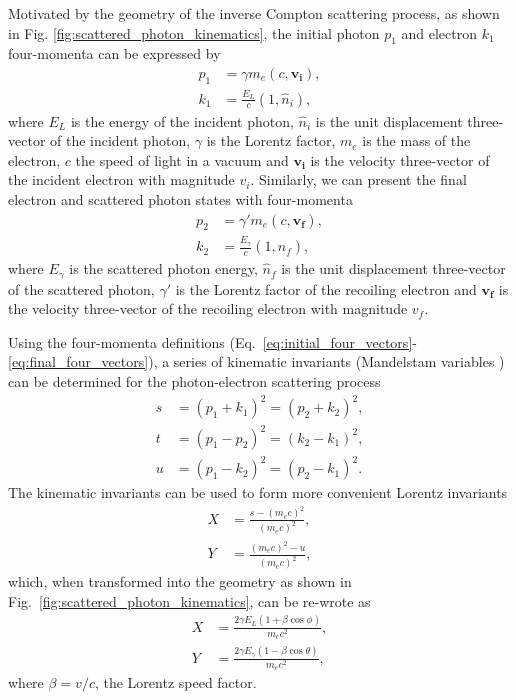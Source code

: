 \documentclass[../main.tex]{subfiles}
\begin{document}
Motivated by the geometry of the inverse Compton scattering process, as shown in Fig. \ref{fig:scattered_photon_kinematics}, the initial photon $p_{1}$ and electron $k_{1}$ four-momenta can be expressed by
\begin{align}
p_{1} &= \gamma m_{e}\left(c,\boldsymbol{v_{i}}\right),
\label{eq:initial_four_vectors} \\
k_{1} &= \frac{E_{L}}{c}\left(1,\hat{n}_{i}\right), 
\end{align}
where $E_{L}$ is the energy of the incident photon, $\hat{n}_{i}$ is the unit displacement three-vector of the incident photon, $\gamma$ is the Lorentz factor, $m_{e}$ is the mass of the electron, $c$ the speed of light in a vacuum and $\boldsymbol{v_{i}}$ is the velocity three-vector of the incident electron with magnitude $v_{i}$. Similarly, we can present the final electron and scattered photon states with four-momenta 
\begin{align}
p_{2} &= \gamma' m_{e}\left(c,\boldsymbol{v_{f}}\right), \\
k_{2} &= \frac{E_{\gamma}}{c}\left(1,\hat{n}_{f}\right), 
\label{eq:final_four_vectors} 
\end{align}
where $E_{\gamma}$ is the scattered photon energy, $\hat{n}_{f}$ is the unit displacement three-vector of the scattered photon, $\gamma'$ is the Lorentz factor of the recoiling electron and $\boldsymbol{v_{f}}$ is the velocity three-vector of the recoiling electron with magnitude $v_{f}$.

Using the four-momenta definitions (Eq.~\ref{eq:initial_four_vectors}-\ref{eq:final_four_vectors}), a  series of kinematic invariants (Mandelstam variables \cite{mandelstam1958determination}) can be determined for the photon-electron scattering process \cite{berestetskii1982quantum}
\begin{align}
s &= \left(p_{1}+k_{1}\right)^{2} = \left(p_{2}+k_{2}\right)^{2},
\label{eq:s_Mandelstam} \\
t &= \left(p_{1}-p_{2}\right)^{2} = \left(k_{2}-k_{1}\right)^{2},
\label{eq:t_Mandelstam} \\
u &= \left(p_{1}-k_{2}\right)^{2} = \left(p_{2}-k_{1}\right)^{2}.
\label{eq:u_Mandelstam}
\end{align}
The kinematic invariants can be used to form more convenient Lorentz invariants
\begin{align}
X &= \frac{s-\left(m_{e}c\right)^{2}}{\left(m_{e}c\right)^{2}},
\label{eq:X_Mandelstam} \\
Y &= \frac{\left(m_{e}c\right)^{2}-u}{\left(m_{e}c\right)^{2}},
\label{eq:Y_Mandelstam}
\end{align}
which, when transformed into the geometry as shown in Fig.~\ref{fig:scattered_photon_kinematics}, can be re-wrote as
\begin{align}
X &= \frac{2\gamma E_{L}\left(1+\beta\cos\phi\right)}{m_{e}c^{2}},
\label{eq:X_geometry} \\
Y &= \frac{2\gamma E_{\gamma}\left(1-\beta\cos\theta\right)}{m_{e}c^{2}},
\label{eq:Y_geometry}
\end{align}
where $\beta = v/c$, the Lorentz speed factor.
\end{document}
